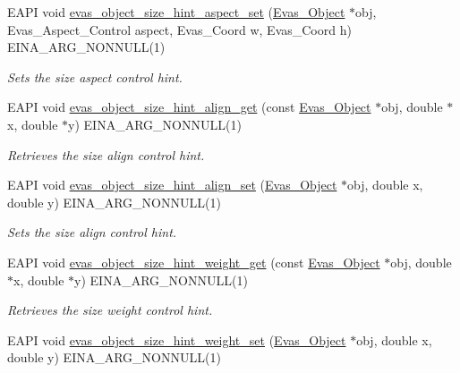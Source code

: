 \begin{DoxyCompactItemize}
EAPI void \hyperlink{group__Evas__Object__Group__Size__Hints_gadb36ccc851e48ae2a11a6e2cb7fcb273}{evas\_\-object\_\-size\_\-hint\_\-aspect\_\-set} (\hyperlink{group__Evas__Object__Group_ga9e19e6dd1f517a0ba437c0114d3e7c97}{Evas\_\-Object} $\ast$obj, Evas\_\-Aspect\_\-Control aspect, Evas\_\-Coord w, Evas\_\-Coord h) EINA\_\-ARG\_\-NONNULL(1)
\begin{DoxyCompactList}\small\item\em Sets the size aspect control hint. \item\end{DoxyCompactList}\item 
EAPI void \hyperlink{group__Evas__Object__Group__Size__Hints_gaff2802d3169b29a786f9b39be3f474bb}{evas\_\-object\_\-size\_\-hint\_\-align\_\-get} (const \hyperlink{group__Evas__Object__Group_ga9e19e6dd1f517a0ba437c0114d3e7c97}{Evas\_\-Object} $\ast$obj, double $\ast$x, double $\ast$y) EINA\_\-ARG\_\-NONNULL(1)
\begin{DoxyCompactList}\small\item\em Retrieves the size align control hint. \item\end{DoxyCompactList}\item 
EAPI void \hyperlink{group__Evas__Object__Group__Size__Hints_ga156cf1921d0be0d7dcf4d6f93daf010f}{evas\_\-object\_\-size\_\-hint\_\-align\_\-set} (\hyperlink{group__Evas__Object__Group_ga9e19e6dd1f517a0ba437c0114d3e7c97}{Evas\_\-Object} $\ast$obj, double x, double y) EINA\_\-ARG\_\-NONNULL(1)
\begin{DoxyCompactList}\small\item\em Sets the size align control hint. \item\end{DoxyCompactList}\item 
EAPI void \hyperlink{group__Evas__Object__Group__Size__Hints_ga66f88dc981e7c0af05822c583e03fabb}{evas\_\-object\_\-size\_\-hint\_\-weight\_\-get} (const \hyperlink{group__Evas__Object__Group_ga9e19e6dd1f517a0ba437c0114d3e7c97}{Evas\_\-Object} $\ast$obj, double $\ast$x, double $\ast$y) EINA\_\-ARG\_\-NONNULL(1)
\begin{DoxyCompactList}\small\item\em Retrieves the size weight control hint. \item\end{DoxyCompactList}\item 
EAPI void \hyperlink{group__Evas__Object__Group__Size__Hints_gabb010d4e7a8772b1785185d89a1a6b98}{evas\_\-object\_\-size\_\-hint\_\-weight\_\-set} (\hyperlink{group__Evas__Object__Group_ga9e19e6dd1f517a0ba437c0114d3e7c97}{Evas\_\-Object} $\ast$obj, double x, double y) EINA\_\-ARG\_\-NONNULL(1)

\end{DoxyCompactItemize}
